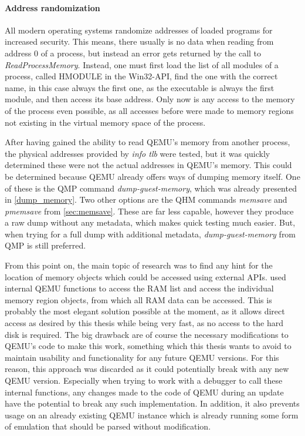 \paragraph{Address randomization}
All modern operating systems randomize addresses of loaded programs for increased security.
This means, there usually is no data when reading from address 0 of a process,
but instead an error gets returned by the call to \emph{ReadProcessMemory}.
Instead, one must first load the list of all modules of a process,
called HMODULE in the Win32-API, find the one with the correct name,
in this case always the first one, as the executable is always the first module,
and then access its base address.
Only now is any access to the memory of the process even possible,
as all accesses before were made to memory regions
not existing in the virtual memory space of the process.

After having gained the ability to read QEMU's memory from another process,
the physical addresses provided by \emph{info tlb} were tested,
but it was quickly determined these were not the actual addresses in QEMU's memory.
This could be determined because QEMU already offers ways of dumping memory itself.
One of these is the QMP command \emph{dump-guest-memory},
which was already presented in \autoref{dump_memory}.
Two other options are the QHM commands \emph{memsave} and \emph{pmemsave} from \autoref{sec:memsave}.
These are far less capable, however they produce a raw dump without any metadata,
which makes quick testing much easier.
But, when trying for a full dump with additional metadata,
\emph{dump-guest-memory} from QMP is still preferred.

From this point on, the main topic of research was to find any hint for the location of memory objects
which could be accessed using external APIs.
 used internal QEMU functions to access the RAM list
and access the individual memory region objects,
from which all RAM data can be accessed\cite{kitcheckpoints}.
This is probably the most elegant solution possible at the moment,
as it allows direct access as desired by this thesis
while being very fast, as no access to the hard disk is required.
The big drawback are of course the necessary modifications to QEMU's code to make this work,
something which this thesis wants to avoid to maintain usability and functionality for any future QEMU versions.
For this reason, this approach was discarded as it could potentially break with any new QEMU version.
Especially when trying to work with a debugger to call these internal functions,
any changes made to the code of QEMU during an update have the potential to break any such implementation.
In addition, it also prevents usage on an already existing QEMU instance
which is already running some form of emulation that should be parsed without modification.

